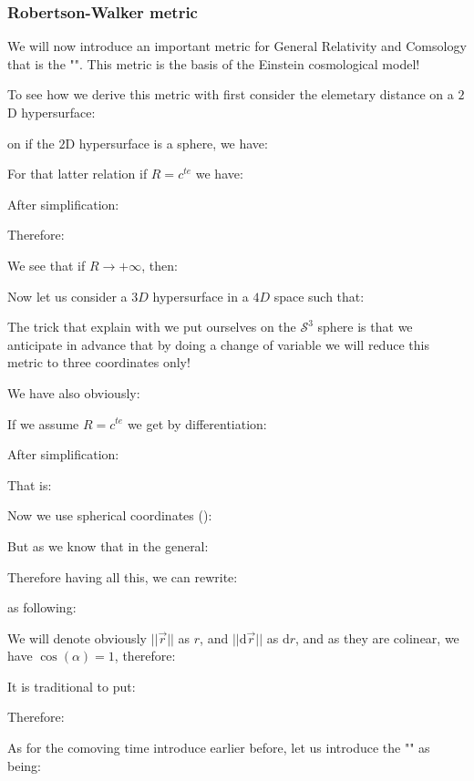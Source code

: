 	\subsubsection{Robertson-Walker metric}
	We will now introduce an important metric for General Relativity and Comsology that is the "". This metric is the basis of the Einstein cosmological model!
	
	To see how we derive this metric with first consider the elemetary distance on a $2$D hypersurface:
	
	on if the $2$D hypersurface is a sphere, we have:
	
	For that latter relation if $R=c^{te}$ we have:
	
	After simplification:
	
	Therefore:
	
	We see that if $R\rightarrow +\infty$, then:
	
	Now let us consider a $3D$ hypersurface in a $4D$ space such that:
	
	The trick that explain with we put ourselves on the $\mathcal{S}^3$ sphere is that we anticipate in advance that by doing a change of variable we will reduce this metric to three coordinates only!
	
	We have also obviously:
	
	If we assume $R=c^{te}$ we get by differentiation:
	
	After simplification:
	
	That is:
	
	Now we use spherical coordinates ():
	
	But as we know that in the general:
	
	Therefore having all this, we can rewrite:
	
	as following:
	
	We will denote obviously $||\vec{r}||$ as $r$, and $||\mathrm{d}\vec{r}||$ as $\mathrm{d}r$, and as they are colinear, we have $\cos(\alpha)=1$, therefore:
	
	It is traditional to put:
	
	Therefore:
	
	As for the comoving time introduce earlier before, let us introduce the "" as being:
	
